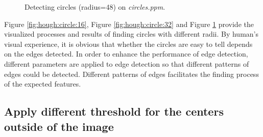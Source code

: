 \documentclass[paper=a4, fontsize=11pt]{scrartcl}
\begin{document}
\begin{figure}[h]
\centering
{}
\caption{Detecting circles (radius=48) on \emph{circles.ppm}.}
\label{fig:hough:circle:48}
\end{figure}

Figure \ref{fig:hough:circle:16}, Figure \ref{fig:hough:circle:32} and Figure \ref{fig:hough:circle:48} provide the visualized processes and results of finding circles with different radii.
By human's visual experience, it is obvious that whether the circles are easy to tell depends on the edges detected.
In order to enhance the performance of edge detection, different parameters are applied to edge detection so that different patterns of edges could be detected.
Different patterns of edges facilitates the finding process of the expected features.

\subsection{Apply different threshold for the centers outside of the image}
\end{document}
